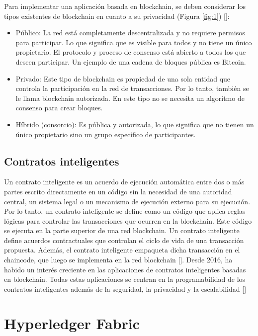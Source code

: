 Para implementar una aplicación basada en blockchain, se deben considerar los tipos existentes de blockchain en cuanto a su privacidad (Figura \ref{fig:1}) [\cite{alhadhrami2017introducing}]:
\begin{itemize}
	\item Público: La red está completamente descentralizada y no requiere permisos para participar. Lo que significa que es visible para todos y no tiene un único propietario. El protocolo y proceso de consenso está abierto a todos los que deseen participar. Un ejemplo de una cadena de bloques pública es Bitcoin.
	\item Privado: Este tipo de blockchain es propiedad de una sola entidad que controla la participación en la red de transacciones. Por lo tanto, también se le llama blockchain autorizada. En este tipo no se necesita un algoritmo de consenso para crear bloques.
	\item Híbrido (consorcio): Es pública y autorizada, lo que significa que no tienen un único propietario sino un grupo específico de participantes.
\end{itemize}

\subsection{Contratos inteligentes}

Un contrato inteligente es un acuerdo de ejecución automática entre dos o más partes escrito directamente en un código sin la necesidad de una autoridad central, un sistema legal o un mecanismo de ejecución externo para su ejecución. Por lo tanto, un contrato inteligente se define como un código que aplica reglas lógicas para controlar las transacciones que ocurren en la blockchain. Este código se ejecuta en la parte superior de una red blockchain. Un contrato inteligente define acuerdos contractuales que controlan el ciclo de vida de una transacción propuesta. Además, el contrato inteligente empaqueta dicha transacción en el chaincode, que luego se implementa en la red blockchain [\cite{zhao2021security}]. Desde 2016, ha habido un interés creciente en las aplicaciones de contratos inteligentes basadas en blockchain. Todas estas aplicaciones se centran en la programabilidad de los contratos inteligentes además de la seguridad, la privacidad y la escalabilidad [\cite{macrinici2018smart}]

\section{Hyperledger Fabric}

